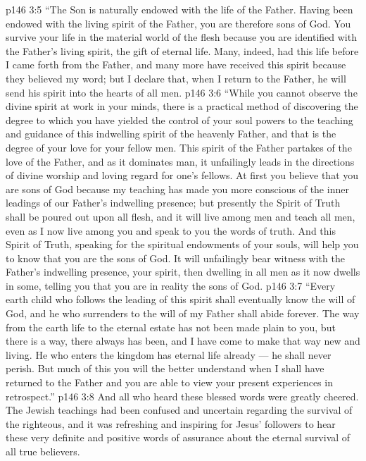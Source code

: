 \vs p146 3:5 \textcolor{ubdarkred}{“The Son is naturally endowed with the life of the Father. Having been endowed with the living spirit of the Father, you are therefore sons of God. You survive your life in the material world of the flesh because you are identified with the Father’s living spirit, the gift of eternal life. Many, indeed, had this life before I came forth from the Father, and many more have received this spirit because they believed my word; but I declare that, when I return to the Father, he will send his spirit into the hearts of all men.}
\vs p146 3:6 \textcolor{ubdarkred}{“While you cannot observe the divine spirit at work in your minds, there is a practical method of discovering the degree to which you have yielded the control of your soul powers to the teaching and guidance of this indwelling spirit of the heavenly Father, and that is the degree of your love for your fellow men. This spirit of the Father partakes of the love of the Father, and as it dominates man, it unfailingly leads in the directions of divine worship and loving regard for one’s fellows. At first you believe that you are sons of God because my teaching has made you more conscious of the inner leadings of our Father’s indwelling presence; but presently the Spirit of Truth shall be poured out upon all flesh, and it will live among men and teach all men, even as I now live among you and speak to you the words of truth. And this Spirit of Truth, speaking for the spiritual endowments of your souls, will help you to know that you are the sons of God. It will unfailingly bear witness with the Father’s indwelling presence, your spirit, then dwelling in all men as it now dwells in some, telling you that you are in reality the sons of God.}
\vs p146 3:7 \textcolor{ubdarkred}{“Every earth child who follows the leading of this spirit shall eventually know the will of God, and he who surrenders to the will of my Father shall abide forever. The way from the earth life to the eternal estate has not been made plain to you, but there is a way, there always has been, and I have come to make that way new and living. He who enters the kingdom has eternal life already --- he shall never perish. But much of this you will the better understand when I shall have returned to the Father and you are able to view your present experiences in retrospect.”}
\vs p146 3:8 And all who heard these blessed words were greatly cheered. The Jewish teachings had been confused and uncertain regarding the survival of the righteous, and it was refreshing and inspiring for Jesus’ followers to hear these very definite and positive words of assurance about the eternal survival of all true believers.
